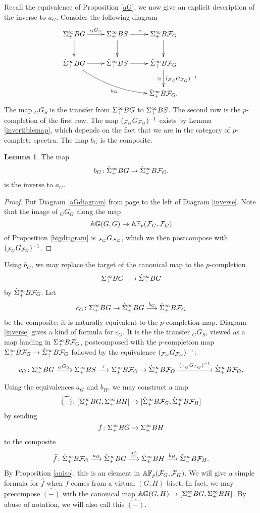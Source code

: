 \documentclass[10pt]{amsart}
\theoremstyle{definition}
\newtheorem{lemma}[theorem]{Lemma}
\begin{document}
Recall the equivalence of Proposition \ref{aG}, we now give an explicit description of the inverse to $a_G$. Consider the following diagram
\begin{equation} \label{inverse}
\xymatrix{\Sinfp BG \ar[r]^{{}_{G}G_{S}} \ar[d] & \Sinfp BS \ar[d] \ar[r]^{r} & \Sinfp B\cF_G \ar[d] \\ \Sinfpp BG  \ar[r] \ar@/_1pc/[rrd]_{b_G} & \Sinfpp BS \ar[r] & \Sinfpp B\cF_G \ar[d]_{\simeq}^{({}_{\cF_G}G_{\cF_G})^{-1}} & \\ && \Sinfpp B\cF_G.}
\end{equation}
The map ${}_{G}G_{S}$ is the transfer from $\Sigma^{\infty}_{+} BG$ to $\Sigma^{\infty}_{+} BS$. The second row is the $p$-completion of the first row. The map $({}_{\mathcal{F}_G}G_{\mathcal{F}_G})^{-1}$ exists by Lemma \ref{invertiblemap}, which depends on the fact that we are in the category of $p$-complete spectra. The map $b_G$ is the composite.


\begin{lemma}
The map
\[
b_G \colon \hat{\Sigma}^{\infty}_{+} BG \rightarrow \hat{\Sigma}^{\infty}_{+} B\mathcal{F}_G.
\]
is the inverse to $a_G$.
\end{lemma}
\begin{proof}
Put Diagram \ref{aGdiagram} from page \pageref{aGdiagram} to the left of Diagram \ref{inverse}. Note that the image of ${}_{G}G_{G}$ along the map
\[
\mathbb{A} \mathbb{G}(G,G) \rightarrow \mathbb{A} \mathbb{F}_p(\mathcal{F}_G,\mathcal{F}_G)
\]
of Proposition \ref{bigdiagram} is ${}_{\mathcal{F}_G}G_{\mathcal{F}_G}$, which we then postcompose with $({}_{\mathcal{F}_G}G_{\mathcal{F}_G})^{-1}$.
\end{proof}

Using $b_G$, we may replace the target of the canonical map to the $p$-completion
\[
\Sigma^{\infty}_{+} BG \overset{}{\longrightarrow} \hat{\Sigma}^{\infty}_{+} BG
\]
by $\hat{\Sigma}^{\infty}_{+} B\mathcal{F}_G$. Let
\[
c_G \colon \Sigma^{\infty}_{+} BG \rightarrow \hat{\Sigma}^{\infty}_{+} BG \overset{b_G}{\longrightarrow} \hat{\Sigma}^{\infty}_{+} B\mathcal{F}_G
\]
be the composite; it is naturally equivalent to the $p$-completion map. Diagram \ref{inverse} gives a kind of formula for $c_G$. It is the the transfer ${}_{G}G_{S}$, viewed as a map landing in $\Sigma^{\infty}_{+} B\mathcal{F}_G$, postcomposed with the $p$-completion map $\Sigma^{\infty}_{+} B\mathcal{F}_G \rightarrow \hat{\Sigma}^{\infty}_{+} B\mathcal{F}_G$ followed by the equivalence $({}_{\mathcal{F}_G}G_{\mathcal{F}_G})^{-1}$:
\begin{equation}\label{cGformula}
c_G\colon \Sigma^{\infty}_{+} BG \xrightarrow{{}_GG_{S}} \Sigma^{\infty}_{+} BS \overset{r}{\longrightarrow} \Sigma^{\infty}_{+} B\mathcal{F}_G \rightarrow \hat{\Sigma}^{\infty}_{+} B\mathcal{F}_G \xrightarrow{{({}_{\mathcal{F}_G}G_{\mathcal{F}_G})^{-1}}} \hat{\Sigma}^{\infty}_{+} B\mathcal{F}_G.
\end{equation}

Using the equivalences $a_G$ and $b_H$, we may construct a map
\[
\widehat{(-)} \colon [\Sigma^{\infty}_{+} BG, \Sigma^{\infty}_{+} BH] \rightarrow [\hat{\Sigma}^{\infty}_{+} B\mathcal{F}_G, \hat{\Sigma}^{\infty}_{+} B\mathcal{F}_H]
\]
by sending
\[
f \colon \Sigma^{\infty}_{+} BG \rightarrow \Sigma^{\infty}_{+} BH
\]
to the composite
\[
\widehat{f} \colon \hat{\Sigma}^{\infty}_{+} B\mathcal{F}_G \overset{a_G}{\longrightarrow} \hat{\Sigma}^{\infty}_{+} BG \overset{f^{\wedge}_{p}}{\longrightarrow} \hat{\Sigma}^{\infty}_{+} BH \overset{b_H}{\longrightarrow} \hat{\Sigma}^{\infty}_{+} B\mathcal{F}_H.
\]
By Proposition \ref{aniso}, this is an element in $\mathbb{A} \mathbb{F}_p(\mathcal{F}_G,\mathcal{F}_H)$. We will give a simple formula for $\widehat{f}$ when $f$ comes from a virtual $(G,H)$-biset. In fact, we may precompose $\widehat{(-)}$ with the canonical map $\mathbb{A} \mathbb{G}(G,H) \rightarrow [\Sigma^{\infty}_{+} BG, \Sigma^{\infty}_{+} BH]$. By abuse of notation, we will also call this $\widehat{(-)}$.
\end{document}
